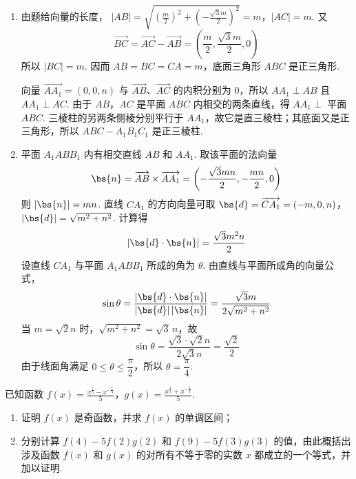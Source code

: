 \begin{solution}
\begin{enumerate}
\item 由题给向量的长度，
\(|AB|=\sqrt{\left(\frac{m}{2}\right)^2+\left(-\frac{\sqrt{3}m}{2}\right)^2}=m\)，\(|AC|=m\).
又
\[
\overrightarrow{BC}=\overrightarrow{AC}-\overrightarrow{AB}
=\left(\frac{m}{2},\frac{\sqrt{3}m}{2},0\right)
\]
所以 \(|BC|=m\). 因而 \(AB=BC=CA=m\)，底面三角形 \(ABC\) 是正三角形.

向量 \(\overrightarrow{AA_1}=(0,0,n)\) 与 \(\overrightarrow{AB}\)、\(\overrightarrow{AC}\) 的内积分别为 \(0\)，所以 \(AA_1\perp AB\) 且 \(AA_1\perp AC\). 由于 \(AB\)，\(AC\) 是平面 \(ABC\) 内相交的两条直线，得 \(AA_1\perp\) 平面 \(ABC\). 三棱柱的另两条侧棱分别平行于 \(AA_1\)，故它是直三棱柱；其底面又是正三角形，所以 \(ABC-A_1B_1C_1\) 是正三棱柱.

\item 平面 \(A_1ABB_1\) 内有相交直线 \(AB\) 和 \(AA_1\). 取该平面的法向量
\[
\bs{n}=\overrightarrow{AB}\times\overrightarrow{AA_1}
=\left(-\frac{\sqrt{3}mn}{2},-\frac{mn}{2},0\right)
\]
则 \(|\bs{n}|=mn\). 直线 \(CA_1\) 的方向向量可取
\(\bs{d}=\overrightarrow{CA_1}=(-m,0,n)\)，\(|\bs{d}|=\sqrt{m^2+n^2}\).
计算得
\[
\left|\bs{d}\cdot\bs{n}\right|=\frac{\sqrt{3}m^2n}{2}
\]
设直线 \(CA_1\) 与平面 \(A_1ABB_1\) 所成的角为 \(\theta\). 由直线与平面所成角的向量公式，
\[
\sin\theta=\frac{|\bs{d}\cdot\bs{n}|}{|\bs{d}|\,|\bs{n}|}
=\frac{\sqrt{3}m}{2\sqrt{m^2+n^2}}
\]
当 \(m=\sqrt{2}n\) 时，\(\sqrt{m^2+n^2}=\sqrt{3}\,n\)，故
\[
\sin\theta=\frac{\sqrt{3}\cdot\sqrt{2}n}{2\sqrt{3}n}=\frac{\sqrt{2}}{2}
\]
由于线面角满足 \(0\leqslant\theta\leqslant\dfrac{\pi}{2}\)，所以 \(\theta=\dfrac{\pi}{4}\).
\end{enumerate}
\end{solution}

\begin{problem}
已知函数 \( f(x) = \frac{x^{\frac{1}{3}} - x^{-\frac{1}{3}}}{5} \)，\( g(x) = \frac{x^{\frac{1}{3}} + x^{-\frac{1}{3}}}{5} \).

\begin{enumerate}
\item 证明 \( f(x) \) 是奇函数，并求 \( f(x) \) 的单调区间；
\item 分别计算 \( f(4) - 5f(2)g(2) \) 和 \( f(9) - 5f(3)g(3) \) 的值，由此概括出涉及函数 \( f(x) \) 和 \( g(x) \) 的对所有不等于零的实数 \( x \) 都成立的一个等式，并加以证明.
\end{enumerate}
\end{problem}

